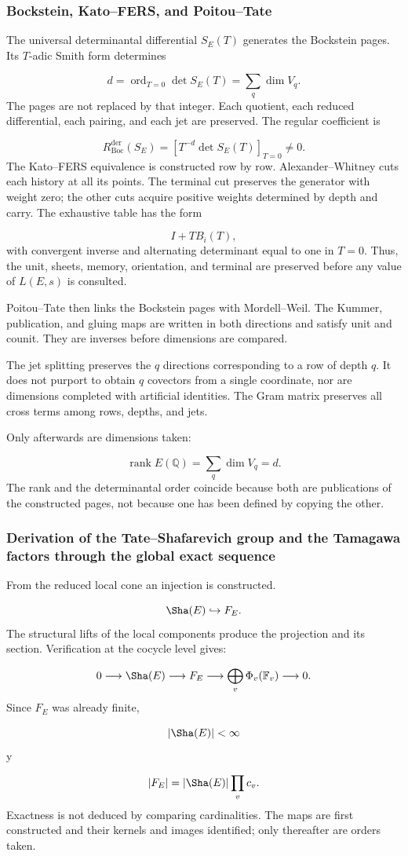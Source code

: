 \subsubsection{Bockstein, Kato–FERS, and Poitou–Tate}
The universal determinantal differential \(S_E(T)\) generates the Bockstein pages. Its \(T\)-adic Smith form determines\par
\[
d
=
\operatorname{ord}_{T=0}
\det S_E(T)
=
\sum_q \dim V_q.
\]
The pages are not replaced by that integer. Each quotient, each reduced differential, each pairing, and each jet are preserved. The regular coefficient is\par
\[
R_{\mathrm{Boc}}^{\mathrm{der}}(S_E)
=
\left[
T^{-d}\det S_E(T)
\right]_{T=0}
\neq0.
\]
The Kato–FERS equivalence is constructed row by row. Alexander–Whitney cuts each history at all its points. The terminal cut preserves the generator with weight zero; the other cuts acquire positive weights determined by depth and carry. The exhaustive table has the form\par
\[
I+TB_i(T),
\]
with convergent inverse and alternating determinant equal to one in
\(T=0\). Thus, the unit, sheets, memory, orientation, and terminal are
preserved before any value of \(L(E,s)\) is consulted.\par
Poitou–Tate then links the Bockstein pages with Mordell–Weil. The Kummer, publication, and gluing maps are written in both directions and satisfy unit and counit. They are inverses before dimensions are compared.\par
The jet splitting preserves the \(q\) directions corresponding to a row of depth \(q\). It does not purport to obtain \(q\) covectors from a single coordinate, nor are dimensions completed with artificial identities. The Gram matrix preserves all cross terms among rows, depths, and jets.\par
Only afterwards are dimensions taken:\par
\[
\operatorname{rank}E(\mathbb Q)
=
\sum_q\dim V_q
=
d.
\]
The rank and the determinantal order coincide because both are publications of the constructed pages, not because one has been defined by copying the other.\par
{}
\subsubsection{Derivation of the Tate–Shafarevich group and the Tamagawa factors through the global exact sequence}
From the reduced local cone an injection is constructed.\par
\[
\Sha(E)\hookrightarrow F_E.
\]
The structural lifts of the local components produce the projection and its section. Verification at the cocycle level gives:\par
\[
0
\longrightarrow
\Sha(E)
\longrightarrow
F_E
\longrightarrow
\bigoplus_v\Phi_v(\mathbb F_v)
\longrightarrow
0.
\]
Since \(F_E\) was already finite,\par
\[
|\Sha(E)|<\infty
\]
y\par
\[
|F_E|
=
|\Sha(E)|
\prod_v c_v.
\]
Exactness is not deduced by comparing cardinalities. The maps are first
constructed and their kernels and images identified; only thereafter are
orders taken.\par
{}
